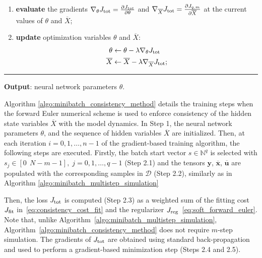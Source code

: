 \documentclass{article} %
\newcommand{\batchsize}{q}
\newcommand{\seqlen}{m}
\newcommand{\numiter}{n}
\newcommand{\nsamp}{N}
\newcommand{\tens}[1]{\bm{#1}}
\newcommand{\Did}{{\mathcal{D}}}
\newcommand{\hidden}[1]{\overline{#1}}
\renewcommand{\theenumi}{\arabic{enumi}}
\renewcommand{\theenumii}{\arabic{enumii}}
\begin{document}
\begin{algorithm}
\begin{enumerate}[label=\arabic*., ref=\theenumi{}]
\begin{enumerate}[label=\theenumi{}.\arabic*., ref=\theenumi{}.\theenumii{}]
\item \textbf{evaluate} the gradients $\nabla_\theta J_{\rm tot}=\frac{\partial J_{tot}}{\partial \theta}$ and  
			$\nabla_{\hidden{X}} J_{\rm tot}=\frac{\partial J_{\batchsize,\seqlen}}{\partial \hidden{X}}$ at the current values of $\theta$ and $\hidden{X}$;
			\item  \textbf{update} optimization variables $\theta$ and $\hidden{X}$:
			\begin{equation*}
			\begin{split}
			 \theta &\leftarrow \theta - \lambda \nabla_\theta J_{\rm tot}  \\
			 \hidden{X} & \leftarrow \hidden{X} - \lambda \nabla_{\hidden{X}} J_{\rm tot};
			\end{split}
			\end{equation*}
		\end{enumerate}
	\end{enumerate}
	\vspace*{-.0cm}\hrule\vspace*{.1cm}
	\textbf{Output}:  neural network parameters $\theta$. 
\end{algorithm} 

Algorithm \ref{algo:minibatch_consistency_method} details the training steps   when the forward Euler numerical scheme is used to enforce consistency of the hidden state variables $\hidden{X}$ with the model dynamics. In Step 1, the neural network parameters $\theta$, and the sequence of hidden variables $\hidden{X}$ are initialized.  Then, at each iteration $i=0,1,\dots, \numiter-1$ of the gradient-based training algorithm, the following steps are executed.
Firstly, the batch start vector $s \in \mathbb{N}^\batchsize$ is selected with $s_j \in [0 \ \  \nsamp-\seqlen-1],\; j=0,1,\dots,\batchsize-1$ (Step 2.1)
and the tensors ${{\tens{y}}}$, ${\hidden{\tens{x}}}$, ${\hidden{\tens{u}}}$  are populated with the corresponding samples in $\Did$ (Step 2.2), similarly as in Algorithm \ref{algo:minibatch_multistep_simulation}
 
Then, the loss $J_{\rm tot}$  is computed (Step 2.3)  as a weighted sum of the fitting cost $J_{\rm fit}$ in~\eqref{eq:consistency_cost_fit} and the regularizer $J_{\rm reg}$~\eqref{eq:soft_forward_euler}. Note that, unlike Algorithm~\ref{algo:minibatch_multistep_simulation},   Algorithm~\ref{algo:minibatch_consistency_method} does not require $\seqlen$-step  simulation. 
The  gradients  of $J_{\rm tot}$ are obtained using standard back-propagation and used to perform a gradient-based minimization step (Steps 2.4 and 2.5). 
\end{document}
